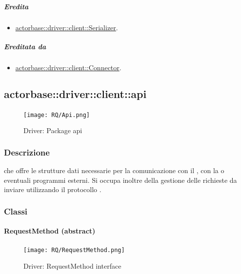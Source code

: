 \documentclass{scalatekids-article}
\begin{document}
\subparagraph{Eredita}
\begin{itemize}
\item \hyperref[sec:actorbase::driver::client::Serializer]{actorbase::driver::client::Serializer}.
\end{itemize}

\subparagraph{Ereditata da}
\begin{itemize}
\item \hyperref[sec:actorbase::driver::client::Connector]{actorbase::driver::client::Connector}.
\end{itemize}



\subsection{actorbase::driver::client::api}
\label{sec:actorbase::driver::client::api}

\begin{figure}[H]
  \begin{center}
    \texttt{[image: RQ/Api.png]}
    \caption{Driver: Package api}
  \end{center}
\end{figure}

\subsubsection{Descrizione}

 che offre le strutture dati necessarie per la comunicazione con
il , con la  o eventuali programmi esterni. Si occupa
inoltre della gestione delle richieste  da inviare utilizzando il
protocollo .

\subsubsection{Classi}

\paragraph{RequestMethod (abstract)}
\label{sec:actorbase::driver::client::api::RequestMethod}

\begin{figure}[H]
  \begin{center}
    \texttt{[image: RQ/RequestMethod.png]}
    \caption{Driver: RequestMethod interface}
  \end{center}
\end{figure}
\end{document}
